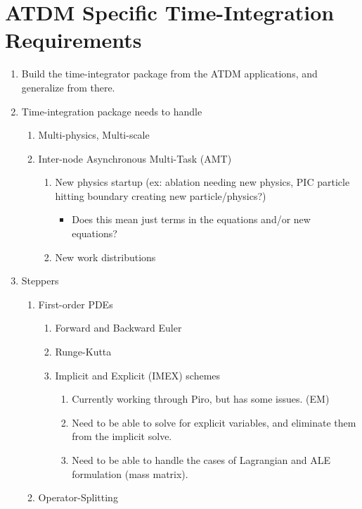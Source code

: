 \section{ATDM Specific Time-Integration Requirements}
\begin{enumerate}
\item Build the time-integrator package from the ATDM applications, and
generalize from there.
\item Time-integration package needs to handle

\begin{enumerate}
\item Multi-physics, Multi-scale
\item Inter-node Asynchronous Multi-Task (AMT)

\begin{enumerate}
\item New physics startup (ex: ablation needing new physics, PIC particle
hitting boundary creating new particle/physics?)

\begin{itemize}
\item Does this mean just terms in the equations and/or new equations?
\end{itemize}
\item New work distributions
\end{enumerate}
\end{enumerate}
\item Steppers

\begin{enumerate}
\item First-order PDEs

\begin{enumerate}
\item Forward and Backward Euler
\item Runge-Kutta
\item Implicit and Explicit (IMEX) schemes

\begin{enumerate}
\item Currently working through Piro, but has some issues. (EM)
\item Need to be able to solve for explicit variables, and eliminate them
from the implicit solve.
\item Need to be able to handle the cases of Lagrangian and ALE formulation
(mass matrix).
\end{enumerate}
\end{enumerate}
\item Operator-Splitting


\end{enumerate}
\end{enumerate}
